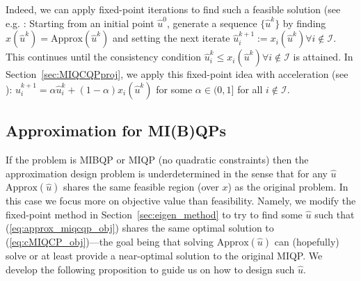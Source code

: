 \documentclass[]{article}
\begin{document}
Indeed, we can apply fixed-point iterations to find such a feasible solution (see e.g. \cite[Chapter 7]{ortega2000iterative}: Starting from an initial point $\hat{u}^0$, generate a sequence $\{\hat{u}^k\}$ by finding $x(\hat{u}^k)=\mbox{Approx}(\hat{u}^k)$ and setting the next iterate $\hat{u}_i^{k+1} := x_i(\hat{u}^k) \forall i\notin \mathcal{I}$. This continues until the consistency condition $\hat{u}_i^{k} \leq x_i(\hat{u}^k) \forall i\notin \mathcal{I}$ is attained. In Section~\ref{sec:MIQCQPproj}, we apply this fixed-point idea with acceleration (see \cite{walker2011anderson}): $\hat{u}_i^{k+1} = \alpha \hat{u}_i^k + (1-\alpha)x_i(\hat{u}^{k})$ for some $\alpha\in(0,1]$ for all $i\notin \mathcal{I}$.

\subsection{Approximation for MI(B)QPs}\label{sec:eigen_method_miqp}

If the problem is MIBQP or MIQP (no quadratic constraints) then the approximation design problem is underdetermined in the sense that for any $\hat{u}$ $\mbox{Approx}(\hat{u})$ shares the same feasible region (over $x$) as the original problem. In this case we focus more on objective value than feasibility. Namely, we modify the fixed-point method in Section~\ref{sec:eigen_method} to try to find some $\hat{u}$ such that (\ref{eq:approx_miqcqp_obj}) shares the same optimal solution to (\ref{eq:cMIQCP_obj})---the goal being that solving $\mbox{Approx}(\hat{u})$ can (hopefully) solve or at least provide a near-optimal solution to the original MIQP. We develop the following proposition to guide us on how to design such $\hat{u}$. 
\end{document}
